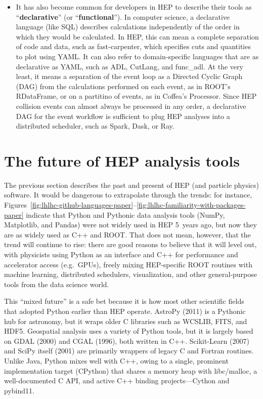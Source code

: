 \documentclass{article}
\begin{document}
\begin{itemize}
\item It has also become common for developers in HEP to describe their tools as ``{\bf declarative}'' (or ``{\bf functional}''). In computer science, a declarative language (like SQL) describes calculations independently of the order in which they would be calculated. In HEP, this can mean a complete separation of code and data, such as fast-carpenter, which specifies cuts and quantities to plot using YAML. It can also refer to domain-specific languages that are as declarative as YAML, such as ADL, CutLang, and func\_adl. At the very least, it means a separation of the event loop as a Directed Cyclic Graph (DAG) from the calculations performed on each event, as in ROOT's RDataFrame, or on a partitino of events, as in Coffea's Processor. Since HEP collision events can almost always be processed in any order, a declarative DAG for the event workflow is sufficient to plug HEP analyses into a distributed scheduler, such as Spark, Dask, or Ray.
\end{itemize}

\section{The future of HEP analysis tools}

The previous section describes the past and present of HEP (and particle physics) software. It would be dangerous to extrapolate through the trends: for instance, Figures~\ref{fig:lhlhc-github-languages-paper}--\ref{fig:lhlhc-familiarity-with-packages-paper} indicate that Python and Pythonic data analysis tools (NumPy, Matplotlib, and Pandas) were not widely used in HEP 5~years ago, but now they are as widely used as C++ and ROOT. That does not mean, however, that the trend will continue to rise: there are good reasons to believe that it will level out, with physicists using Python as an interface and C++ for performance and accelerator access (e.g.\ GPUs), freely mixing HEP-specific ROOT routines with machine learning, distributed schedulers, visualization, and other general-purpose tools from the data science world.

This ``mixed future'' is a safe bet because it is how most other scientific fields that adopted Python earlier than HEP operate. AstroPy (2011) is a Pythonic hub for astronomy, but it wraps older C libraries such as WCSLIB, FITS, and HDF5. Geospatial analysis uses a variety of Python tools, but it is largely based on GDAL (2000) and CGAL (1996), both written in C++. Scikit-Learn (2007) and SciPy itself (2001) are primarily wrappers of legacy C and Fortran routines. Unlike Java, Python mixes well with C++, owing to a single, prominent implementation target (CPython) that shares a memory heap with libc/malloc, a well-documented C API, and active C++ binding projects---Cython and pybind11.
\end{document}
